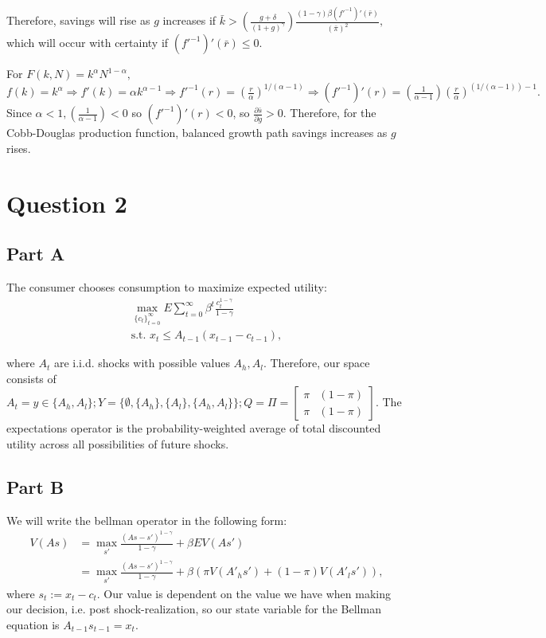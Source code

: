 \documentclass[11pt]{article} %
\begin{document}
Therefore, savings will rise as $g$ increases if $ \bar{k} > \left( \frac{g+\delta}{(1+g)^{\gamma}} \right) \frac{(1-\gamma)\beta (f'^{-1})'(\bar{r})}{(\bar{\pi})^2},$ which will occur with certainty if $(f'^{-1})'(\bar{r})\leq0.$

For $F(k,N) = k^{\alpha} N^{1-\alpha},$ $f(k) = k^{\alpha} \Rightarrow f'(k) = \alpha k^{\alpha - 1} \Rightarrow f'^{-1}(r) = \left(\frac{r}{\alpha}\right)^{1/(\alpha-1)} \Rightarrow (f'^{-1})'(r) = \left( \frac{1}{\alpha - 1}\right) \left(\frac{r}{\alpha}\right)^{(1/(\alpha-1)) - 1}. $ Since $\alpha<1,  \left( \frac{1}{\alpha - 1}\right) <0$ so $(f'^{-1})'(r)<0$, so $\frac{\partial \bar{s}}{\partial g}>0$. Therefore, for the Cobb-Douglas production function, balanced growth path savings increases as $g$ rises.

\section{Question 2}
\subsection{Part A}
The consumer chooses consumption to maximize expected utility:
\begin{align*}
\max_{\{c_t\}_{t=0}^{\infty}} E\sum_{t=0}^{\infty}\beta^t \frac{c_t^{1-\gamma}}{1-\gamma}\\
\text{s.t. } x_t \leq A_{t-1}(x_{t-1} - c_{t-1}),
\end{align*}

where $A_t$ are i.i.d. shocks with possible values $A_h,A_l$. Therefore, our space consists of $A_t = y \in \{ A_h,A_l \}; Y = \{ \emptyset, \{A_h\},\{ A_l\}, \{ A_h,A_l\}\}; Q = \Pi = \begin{bmatrix} \pi & (1-\pi) \\ \pi & (1-\pi)\end{bmatrix}$. The expectations operator is the probability-weighted average of total discounted utility across all possibilities of future shocks. 
\subsection{Part B}
We will write the bellman operator in the following form:
\begin{align*}
V(As) &= \max_{s'} \frac{(As - s')^{1-\gamma}}{1-\gamma} + \beta EV(As')\\
&= \max_{s'} \frac{(As - s')^{1-\gamma}}{1-\gamma} + \beta (\pi V(A'_h s') + (1-\pi) V(A'_l s' )),
\end{align*}
where $s_t := x_t - c_t$. Our value is dependent on the value we have when making our decision, i.e. post shock-realization, so our state variable for the Bellman equation is $A_{t-1}s_{t-1} = x_t$.
\end{document}
